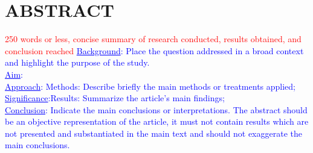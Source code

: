 
\noindent\section{ABSTRACT}
\textcolor{red}{250 words or less, concise summary of research conducted, results obtained, and conclusion reached}
\textcolor{blue}{\uline{Background}: Place the question addressed in a broad context and highlight the purpose of the study.}\\

\textcolor{blue}{\noindent\uline{Aim}: }\\

\textcolor{blue}{\noindent\uline{Approach}: Methods: Describe briefly the main methods or treatments applied;}\\

\textcolor{blue}{\noindent\uline{Significance}:Results: Summarize the article’s main findings;}\\ 

\textcolor{blue}{\noindent\uline{Conclusion}: Indicate the main conclusions or interpretations. The abstract should be an objective representation of the article, it must not contain results which are not presented and substantiated in the main text and should not exaggerate the main conclusions.}
